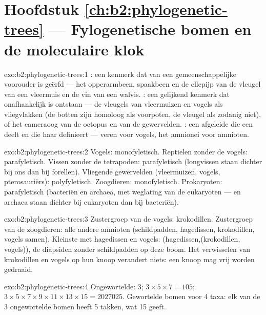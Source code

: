 \section*{Hoofdstuk \ref{ch:b2:phylogenetic-trees} --- Fylogenetische bomen en de moleculaire klok}

\begin{solution}{exo:b2:phylogenetic-trees:1}
: een kenmerk dat van een gemeenschappelijke voorouder is geërfd ---
het opperarmbeen, spaakbeen en de ellepijp van de vleugel van een vleermuis en
de vin van een walvis. : een gelijkend kenmerk dat onafhankelijk is
ontstaan --- de vleugels van vleermuizen en vogels als vliegvlakken (de botten
zijn homoloog als voorpoten, de vleugel als zodanig niet), of het cameraoog van
de octopus en van de gewervelden. : een afgeleide  die een
 deelt en die haar definieert --- veren voor vogels, het amnionei
voor amnioten.
\end{solution}

\begin{solution}{exo:b2:phylogenetic-trees:2}
Vogels: monofyletisch. Reptielen zonder de vogels: parafyletisch.
Vissen zonder de tetrapoden: parafyletisch (longvissen staan dichter bij ons dan bij
forellen). Vliegende gewervelden (vleermuizen, vogels, pterosauriërs):
polyfyletisch. Zoogdieren: monofyletisch. Prokaryoten: parafyletisch (bacteriën
en archaea, met weglating van de eukaryoten --- en archaea staan dichter bij
eukaryoten dan bij bacteriën).
\end{solution}

\begin{solution}{exo:b2:phylogenetic-trees:3}
Zustergroep van de vogels: krokodillen. Zustergroep van de zoogdieren: alle
andere amnioten (schildpadden, hagedissen, krokodillen, vogels samen). Kleinste
 met hagedissen en vogels: (hagedissen,(krokodillen, vogels)), de
diapsiden zonder schildpadden op deze boom. Het verwisselen van krokodillen en
vogels op hun knoop verandert niets: een knoop mag vrij worden gedraaid.
\end{solution}

\begin{solution}{exo:b2:phylogenetic-trees:4}
Ongewortelde: $3$; $3\times 5\times 7 = 105$; $3\times 5\times
7\times 9\times 11\times 13\times 15 = \num{2027025}$. Gewortelde bomen
voor 4 taxa: elk van de 3 ongewortelde bomen heeft 5 takken, wat 15 geeft.
\end{solution}

